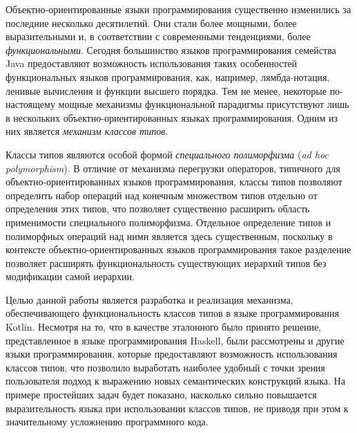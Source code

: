 \intro

Объектно-ориентированные языки программирования существенно изменились за последние несколько десятилетий. Они стали более мощными, более выразительными и, в соответствии с современными тенденциями, более \emph{функциональными}. Сегодня большинство языков программирования семейства Java предоставляют возможность использования таких особенностей функциональных языков программирования, как, например, лямбда-нотация, ленивые вычисления и функции высшего порядка. Тем не менее, некоторые по-настоящему мощные механизмы функциональной парадигмы присутствуют лишь в нескольких объектно-ориентированных языках программирования. Одним из них является \emph{механизм классов типов}.

Классы типов являются особой формой \emph{специального полиморфизма} (\emph{ad hoc polymorphism}). В отличие от механизма перегрузки операторов, типичного для объектно-ориентированных языков программирования, классы типов позволяют определить набор операций над конечным множеством типов отдельно от определения этих типов, что позволяет существенно расширить область применимости специального полиморфизма. Отдельное определение типов и полиморфных операций над ними является здесь существенным, поскольку в контексте объектно-ориентированных языков программирования такое разделение позволяет расширять функциональность существующих иерархий типов без модификации самой иерархии.   

Целью данной работы является разработка и реализация механизма, обеспечивающего функциональность классов типов в языке программирования Kotlin. Несмотря на то, что в качестве эталонного было принято решение, представленное в языке программирования Haskell, были рассмотрены и другие языки программирования, которые предоставляют возможность использования классов типов, что позволило выработать наиболее удобный с точки зрения пользователя подход к выражению новых семантических конструкций языка. На примере простейших задач будет показано, насколько сильно повышается выразительность языка при использовании классов типов, не приводя при этом к значительному усложнению программного кода.

